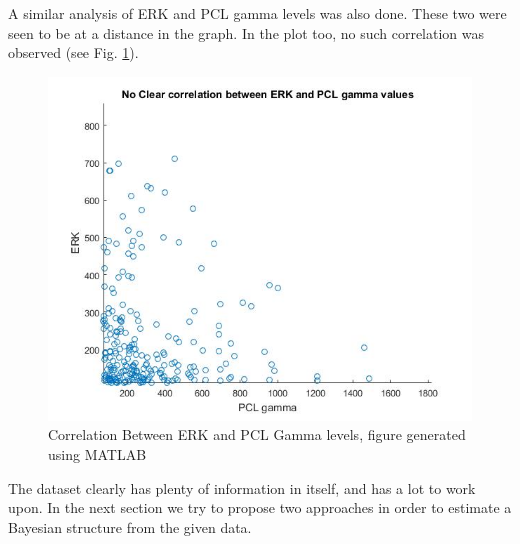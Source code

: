 \documentclass[conference]{IEEEtran}
\begin{document}
A similar analysis of ERK and PCL gamma levels was also done. These two were seen to be at a distance in the graph. In the plot too, no such correlation was observed (see Fig. \ref{fig:erkpcl}).
\begin{figure}[H]
  \includegraphics[width=\linewidth]{Images/erkpcl.jpg}
  \caption{Correlation Between ERK and PCL Gamma levels, figure generated using MATLAB}
  \label{fig:erkpcl}
\end{figure}
\par
The dataset clearly has plenty of information in itself, and has a lot to work upon. In the next section we try to propose two approaches in order to estimate a Bayesian structure from the given data.

\noindent\makebox[\linewidth]{\rule{\linewidth}{0.4pt}}
\end{document}
